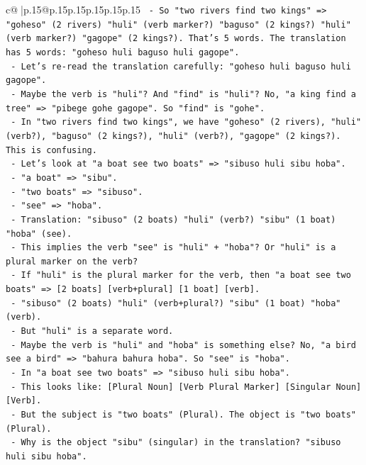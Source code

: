 \documentclass{article}
\begin{document}
{\begin{supertabular}{c@{$\;$}|p{.15\linewidth}@{}p{.15\linewidth}p{.15\linewidth}p{.15\linewidth}p{.15\linewidth}p{.15\linewidth}}
{{{\texttt{          {-} So "two rivers find two kings" => "goheso" (2 rivers) "huli" (verb marker?) "baguso" (2 kings?) "huli" (verb marker?) "gagope" (2 kings?). That's 5 words. The translation has 5 words: "goheso huli baguso huli gagope".} \\
\texttt{          {-} Let's re{-}read the translation carefully: "goheso huli baguso huli gagope".} \\
\texttt{          {-} Maybe the verb is "huli"? And "find" is "huli"? No, "a king find a tree" => "pibege gohe gagope". So "find" is "gohe".} \\
\texttt{          {-} In "two rivers find two kings", we have "goheso" (2 rivers), "huli" (verb?), "baguso" (2 kings?), "huli" (verb?), "gagope" (2 kings?). This is confusing.} \\
\texttt{          {-} Let's look at "a boat see two boats" => "sibuso huli sibu hoba".} \\
\texttt{            {-} "a boat" => "sibu".} \\
\texttt{            {-} "two boats" => "sibuso".} \\
\texttt{            {-} "see" => "hoba".} \\
\texttt{            {-} Translation: "sibuso" (2 boats) "huli" (verb?) "sibu" (1 boat) "hoba" (see).} \\
\texttt{            {-} This implies the verb "see" is "huli" + "hoba"? Or "huli" is a plural marker on the verb?} \\
\texttt{            {-} If "huli" is the plural marker for the verb, then "a boat see two boats" => {[}2 boats{]} {[}verb+plural{]} {[}1 boat{]} {[}verb{]}.} \\
\texttt{            {-} "sibuso" (2 boats) "huli" (verb+plural?) "sibu" (1 boat) "hoba" (verb).} \\
\texttt{            {-} But "huli" is a separate word.} \\
\texttt{            {-} Maybe the verb is "huli" and "hoba" is something else? No, "a bird see a bird" => "bahura bahura hoba". So "see" is "hoba".} \\
\texttt{            {-} In "a boat see two boats" => "sibuso huli sibu hoba".} \\
\texttt{            {-} This looks like: {[}Plural Noun{]} {[}Verb Plural Marker{]} {[}Singular Noun{]} {[}Verb{]}.} \\
\texttt{            {-} But the subject is "two boats" (Plural). The object is "two boats" (Plural).} \\
\texttt{            {-} Why is the object "sibu" (singular) in the translation? "sibuso huli sibu hoba".} \\
}}}
\end{supertabular}}
\end{document}
